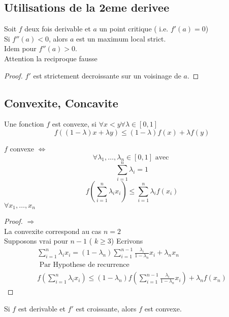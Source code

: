 \documentclass[../main.tex]{subfiles}
\begin{document}
\subsection{Utilisations de la 2eme derivee}
\begin{propo}
	Soit $f$ deux fois derivable et $a$ un point critique ( i.e. $f'( a) =0$)\\
	Si $f''( a) <0$, alors $a$ est un maximum local strict.\\
	Idem pour $f''( a) > 0$.\\
	Attention la reciproque fausse
\end{propo}
\begin{proof}
$f'$ est strictement decroissante sur un voisinage de $a$.
\end{proof}
\subsection{Convexite, Concavite}
\begin{defn}[Convexe]
	Une fonction $f$ est convexe, si $\forall x < y\forall \lambda \in [ 0,1] $ 
	\[ 
		f( ( 1-\lambda)x + \lambda y) \leq ( 1-\lambda) f( x) + \lambda f( y) 
	\]
	

\end{defn}
\begin{propo}
$f$ convexe $\iff$ 
\[ 
\forall \lambda_1, \ldots , \lambda_n \in [ 0,1] \text{ avec } 
\]
\[ 
\sum_{i=1}^{ n}\lambda_i =1
\]
\[ 
	f ( \sum_{i=1}^{ n}\lambda_i x_i) \leq \sum_{i=1} ^{n} \lambda_i f( x_i) 
\]
$\forall x_1,\ldots, x_n$
\end{propo}
\begin{proof}
$\Rightarrow$ \\
La convexite correspond au cas $n= 2$\\
Supposons vrai pour $n-1$ ( $k \geq 3$) 
Ecrivons
\begin{align*}
	\sum_{i=1}^{ n} \lambda_i x_i = ( 1- \lambda_n)   \sum_{i=1}^{ n-1} \frac{\lambda_i}{1-\lambda_n} x_i + \lambda_n x_n\\
	\text{ Par Hypothese de recurrence } \\
	f (  \sum_{i=1}^{ n}\lambda_i x_i) \leq ( 1- \lambda_n) f( \sum_{i=1}^{ n-1}\frac{\lambda_i }{1- \lambda_n}x_i) + \lambda_n f( x_n)
\end{align*}

\end{proof}
\begin{thm}
Si $f$ est derivable et $f'$ est croissante, alors $f$ est convexe.
\end{thm}
\end{document}
